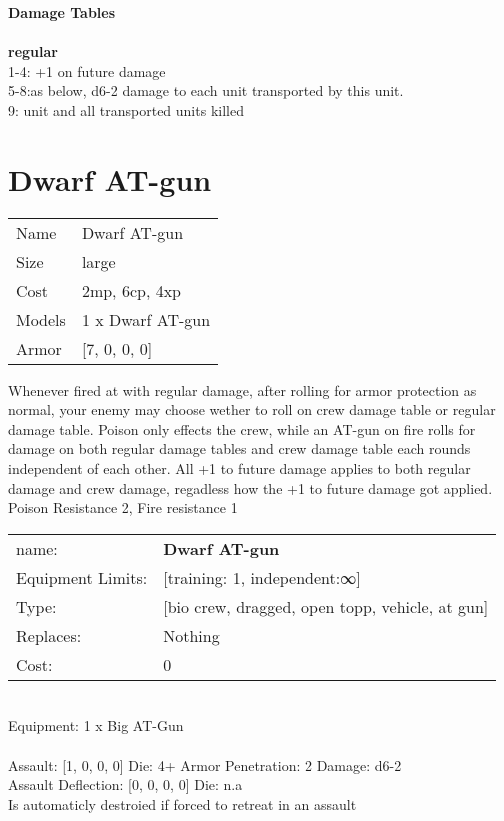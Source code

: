 {\bf Damage Tables} \\
\ \\ {\bf regular } \\
1-4: +1 on future damage \\
5-8:as below, d6-2 damage to each unit transported by this unit. \\
9: unit and all transported units killed \\










\pagebreak\pagebreak

\section{ Dwarf AT-gun }

\begin{tabular}{ll}
  Name & Dwarf AT-gun \\
  Size & large\\
  Cost & 2mp, 6cp, 4xp\\
  Models & 1 x Dwarf AT-gun\\
  Armor & [7, 0, 0, 0]\\
\end{tabular}

\noindent Whenever fired at with regular damage, after rolling for armor protection as normal, your enemy may choose wether to roll on crew damage table or regular damage table. Poison only effects the crew, while an AT-gun on fire rolls for damage on both regular damage tables and crew damage table each rounds independent of each other. All +1 to future damage applies to both regular damage and crew damage, regadless how the +1 to future damage got applied.\\ 
 Poison Resistance 2, Fire resistance 1\\ 


\noindent
\begin{tabular}{ll}
name: &{\bf Dwarf AT-gun } \\
Equipment Limits: &[training: 1, independent:∞] \\
Type: &[bio crew, dragged, open topp, vehicle, at gun] \\
Replaces: &Nothing \\
Cost: & 0\\
\end{tabular}
\ \\
Equipment: 1 x Big AT-Gun \\
\ \\
Assault: [1, 0, 0, 0] Die: 4+ Armor Penetration: 2 Damage: d6-2 \\
Assault Deflection: [0, 0, 0, 0] Die: n.a\\
\indent Is automaticly destroied if forced to retreat in an assault\\ 
 
